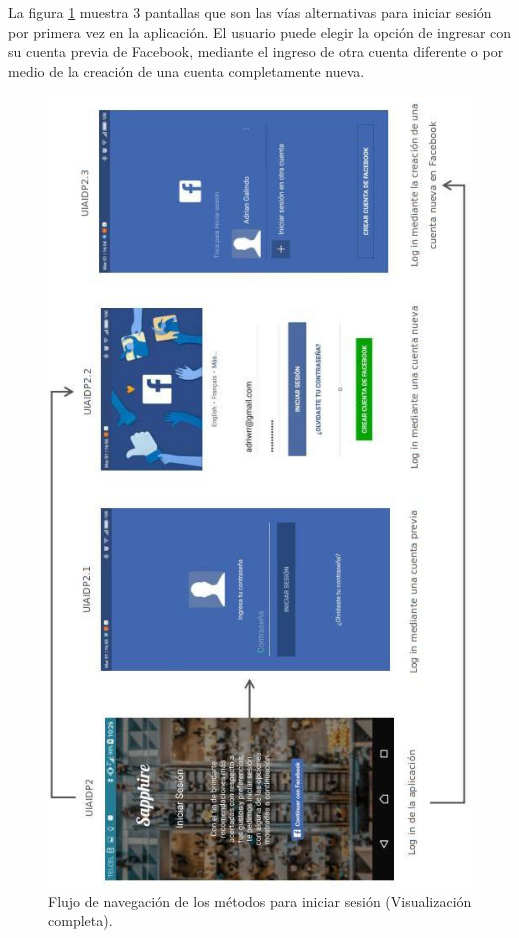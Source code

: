 La figura \ref{image:flujoInicio} muestra 3 pantallas que son las vías alternativas para iniciar sesión por primera vez en la aplicación. El usuario puede elegir la opción de ingresar con su cuenta previa de Facebook, mediante el ingreso de otra cuenta diferente o por medio de la creación de una cuenta completamente nueva.
\FloatBarrier
\begin{figure}[htbp!]
		\centering
			\includegraphics[width=.5 \textwidth]{imagenes/UI_userapp/mapaInicioH}
		\caption{Flujo de navegación de los métodos para iniciar sesión (Visualización completa).}
		\label{image:flujoInicio}		
\end{figure}
\FloatBarrier

